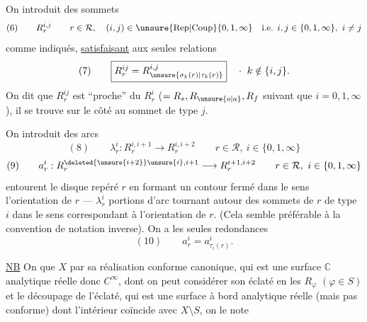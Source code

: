 
On introduit des sommets
\[
(6)\qquad R_r^{i,j}\qquad r\in\mathcal{R},\quad (i,j)\in\operatorname{\unsure{Rep|Coup}}\{0,1,\infty\}\quad\text{i.e. }i,j\in\{0,1,\infty\},\ i\ne j
\]
comme indiqués, \uline{satisfaisant} aux seules relations
\[
(7)\qquad \boxed{R_r^{ij}=R_{\unsure{\sigma_k(r)|\tau_k(r)}}^{i,j}}\quad\cdot\ k\notin\{i,j\}.
\]
On dit que $R_r^{ij}$ est ``proche'' du  $R_r^i$  ($=R_s,R_{\unsure{o|a}},R_f$ suivant que $i=0,1,\infty$), il se trouve sur le côté    au sommet de type $j$.

On introduit des arcs
\[
(8)\qquad \lambda_r^i:R_r^{i,i+1}\longrightarrow R_r^{i,i+2}\qquad r\in\mathcal{R},\ i\in\{0,1,\infty\}
\]
\[
(9)\qquad a_r^i:R_r^{\deleted{\unsure{i+2}}\unsure{i},i+1}\longrightarrow R_r^{i+1,i+2}\qquad r\in\mathcal{R},\ i\in\{0,1,\infty\}
\]
  entourent le disque repéré $r$ en formant un contour fermé dans le sens   l'orientation de $r$ ---   $\lambda_r^i$   portions d'arc tournant autour des sommets de $r$ de type $i$ dans le sens correspondant à l'orientation de $r$. (Cela  semble préférable à la convention de notation inverse). On a les seules  redondances
\[
(10)\qquad \boxed{a_r^i=a_{\tau_i(r)}^i}.
\]

\uline{NB} On  que $X$   par sa réalisation conforme canonique, qui est une surface $\mathbb{C}$ analytique réelle donc $C^\infty$, dont on peut considérer son éclaté en les $R_\varphi$ $(\varphi\in S)$ et le découpage de l'éclaté, qui est une surface à bord analytique réelle (mais pas conforme) dont l'intérieur coïncide avec $X\setminus S$, on le note


